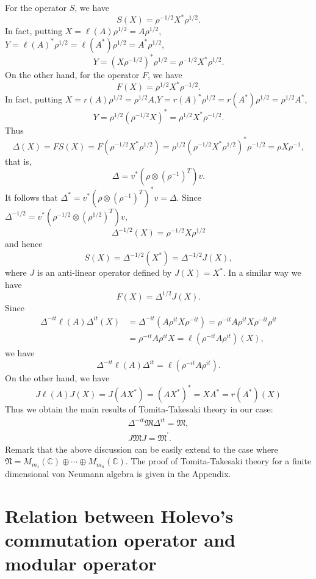 \documentclass{article}
\begin{document}
For the operator $S$, we have 
	$$
    S(X)=\rho^{-1/2}X^*\rho^{1/2}.
 	$$
	In fact, putting $X=\ell(A)\rho^{1/2}=A\rho^{1/2}$,$Y=\ell(A)^\ast\rho^{1/2}=\ell(A^\ast)\rho^{1/2}=A^\ast \rho^{1/2}$,
	$$
    Y=(X\rho^{-1/2})^\ast \rho^{1/2}=\rho^{-1/2}X^\ast\rho^{1/2}.
  $$
On the other hand, for the operator $F$, we have
$$
F(X)=\rho^{1/2}X^\ast \rho^{-1/2}.
$$
In fact, putting $X=r(A)\rho^{1/2}=\rho^{1/2}A$,$Y=r(A)^\ast\rho^{1/2}=r(A^\ast)\rho^{1/2}= \rho^{1/2}A^\ast$,
	$$
    Y= \rho^{1/2}(\rho^{-1/2}X)^\ast=\rho^{1/2}X^\ast\rho^{-1/2}.
  $$
Thus
$$
\Delta(X)=FS(X)=F(\rho^{-1/2}X^*\rho^{1/2})=\rho^{1/2}(\rho^{-1/2}X^*\rho^{1/2})^\ast \rho^{-1/2}=\rho X \rho^{-1},
$$
that is, 
\begin{equation}\label{Delta}
\Delta=v^\ast(\rho \otimes ({\rho}^{-1})^T) v.
\end{equation}
It follows that $\Delta^\ast=v^\ast (\rho\otimes({\rho}^{-1})^T)^\ast v=\Delta$.
Since $\Delta^{-1/2}=v^\ast(\rho^{-1/2}\otimes ({\rho}^{1/2})^T) v$, 
$$
\Delta^{-1/2}(X)=\rho^{-1/2}X\rho^{1/2}
$$
and hence 
$$
S(X)=\Delta^{-1/2}(X^\ast)=\Delta^{-1/2}J(X),
$$
where $J$ is an anti-linear operator defined by $J(X)=X^\ast$.
In a similar way we have
$$
F(X)=\Delta^{1/2}J(X).
$$
Since
\begin{equation}
\begin{split}
\Delta^{-it}\ell(A)\Delta^{it}(X)&=\Delta^{-it}(A\rho^{it}X\rho^{-it})=\rho^{-it}A\rho^{it}X\rho^{-it}\rho^{it}\\
                                 &=\rho^{-it}A\rho^{it}X=\ell (\rho^{-it}A\rho^{it})(X),
\end{split}
\end{equation}
we have 
$$
\Delta^{-it}\ell(A)\Delta^{it}=\ell(\rho^{-it}A\rho^{it}).
$$
On the other hand,
we have
$$
J\ell(A)J(X)=J(AX^\ast)=(AX^\ast)^\ast=XA^\ast=r(A^\ast)(X)
$$
Thus we obtain the main results of Tomita-Takesaki theory in our case: 
\begin{equation}
\begin{split}
\Delta^{-it}\mathfrak{M}\Delta^{it}=\mathfrak{M},\\
          J\mathfrak{M}J=\mathfrak{M}^{\prime}.
\end{split}
\end{equation}
Remark that the above discussion can be easily extend to the case where 
$\mathfrak{N}=M_{m_1}(\mathbb{C})\oplus \cdots \oplus M_{m_n}(\mathbb{C})$.
The proof of Tomita-Takesaki theory for a finite dimensional von Neumann algebra is given in the Appendix.


\section{Relation between Holevo's commutation operator and modular operator}
\end{document}
